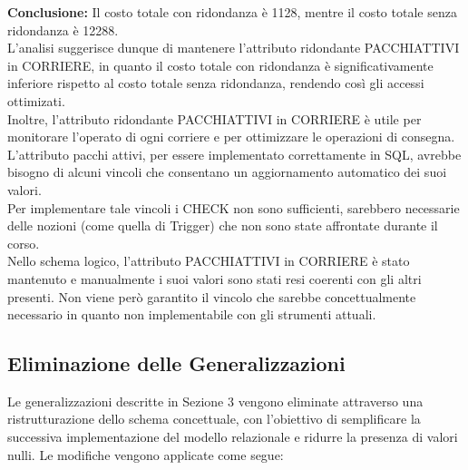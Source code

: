 \textbf{Conclusione:} Il costo totale con ridondanza è 1128, mentre il costo totale senza ridondanza è 12288.\\
L'analisi suggerisce dunque di mantenere l'attributo ridondante PACCHIATTIVI in CORRIERE, in quanto il costo totale con ridondanza è significativamente inferiore rispetto al costo totale senza ridondanza, rendendo così gli accessi ottimizati.\\
Inoltre, l'attributo ridondante PACCHIATTIVI in CORRIERE è utile per monitorare l'operato di ogni corriere e per ottimizzare le operazioni di consegna.
L'attributo pacchi attivi, per essere implementato correttamente in SQL, avrebbe bisogno di alcuni vincoli che consentano un aggiornamento automatico dei suoi valori.\\
Per implementare tale vincoli i CHECK non sono sufficienti, sarebbero necessarie delle nozioni (come quella di Trigger) che non sono state affrontate durante il corso.\\
Nello schema logico, l'attributo PACCHIATTIVI in CORRIERE è stato mantenuto e manualmente i suoi valori sono stati resi coerenti con gli altri presenti. Non viene però garantito il vincolo che sarebbe concettualmente necessario in quanto non implementabile con gli strumenti attuali.





\subsection{Eliminazione delle Generalizzazioni}

Le generalizzazioni descritte in Sezione 3 vengono eliminate attraverso una ristrutturazione dello schema concettuale, con l’obiettivo di semplificare la successiva implementazione del modello relazionale e ridurre la presenza di valori nulli. Le modifiche
vengono applicate come segue:

